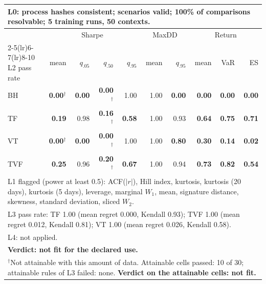 \begin{tabular}{lrrrrrrrrr}
\toprule
\multicolumn{10}{p{13.5cm}}{L0: process hashes consistent; scenarios valid; 100\% of comparisons resolvable; 5 training runs, 50 contexts.} \\
\midrule
 & \multicolumn{4}{c}{Sharpe} & \multicolumn{2}{c}{MaxDD} & \multicolumn{3}{c}{Return} \\
\cmidrule(lr){2-5}\cmidrule(lr){6-7}\cmidrule(lr){8-10}
L2 pass rate & mean & $q_{.05}$ & $q_{.50}$ & $q_{.95}$ & mean & $q_{.95}$ & mean & VaR & ES \\
\midrule
BH & \textbf{0.00}$^{\dagger}$ & \textbf{0.00} & \textbf{0.00}$^{\dagger}$ & 1.00 & 1.00 & \textbf{0.00} & \textbf{0.00} & \textbf{0.00} & \textbf{0.00} \\
TF & \textbf{0.19} & 0.98 & \textbf{0.16}$^{\dagger}$ & \textbf{0.58} & 1.00 & 0.93 & \textbf{0.64} & \textbf{0.75} & \textbf{0.71} \\
VT & \textbf{0.00}$^{\dagger}$ & \textbf{0.00} & \textbf{0.00}$^{\dagger}$ & 1.00 & 1.00 & \textbf{0.80} & \textbf{0.30} & \textbf{0.14} & \textbf{0.02} \\
TVF & \textbf{0.25} & 0.96 & \textbf{0.20}$^{\dagger}$ & \textbf{0.67} & 1.00 & 0.94 & \textbf{0.73} & \textbf{0.82} & \textbf{0.54} \\
\midrule
\multicolumn{10}{p{13.5cm}}{L1 flagged (power at least 0.5): ACF($|r|$), Hill index, kurtosis, kurtosis (20 days), kurtosis (5 days), leverage, marginal $W_1$, mean, signature distance, skewness, standard deviation, sliced $W_2$.} \\
\multicolumn{10}{p{13.5cm}}{L3 pass rate: TF 1.00 (mean regret 0.000, Kendall 0.93); TVF 1.00 (mean regret 0.012, Kendall 0.81); VT 1.00 (mean regret 0.026, Kendall 0.58).} \\
\multicolumn{10}{p{13.5cm}}{L4: not applied.} \\
\multicolumn{10}{p{13.5cm}}{\textbf{Verdict: not fit for the declared use.}} \\
\multicolumn{10}{p{13.5cm}}{$^{\dagger}$Not attainable with this amount of data. Attainable cells passed: 10 of 30; attainable rules of L3 failed: none. \textbf{Verdict on the attainable cells: not fit.}} \\
\bottomrule
\end{tabular}
